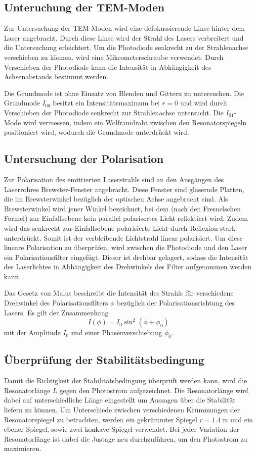 \subsection{Unteruchung der TEM-Moden}
Zur Untersuchung der TEM-Moden wird eine defokussierende Linse hinter dem Laser
angebracht.
Durch diese Linse wird der Strahl des Lasers verbreitert und die Untersuchung
erleichtert.
Um die Photodiode senkrecht zu der Strahlenachse verschieben zu können, wird eine
Mikrometerschraube verwendet. Durch Verschieben der Photodiode kann
die Intensität in Abhängigkeit des Achsenabstands bestimmt werden.

Die Grundmode ist ohne Einsatz von Blenden und Gittern zu untersuchen.
Die Grundmode $I_{00}$ besitzt ein Intensitätsmaximum bei $r = 0$
und wird durch Verschieben der Photodiode senkrecht zur Strahlenachse
untersucht.
Die $I_{01}$-Mode wird vermessen,
indem ein Wolframdraht zwischen den Resonatorspiegeln positioniert wird,
wodurch die Grundmode unterdrückt wird.


\subsection{Untersuchung der Polarisation}
Zur Polarisation des emittierten Laserstrahls sind an den Ausgängen des
Laserrohres Brewster-Fenster angebracht.
Diese Fenster sind gläsernde Platten, die im Brewsterwinkel bezüglich der
optischen Achse angebracht sind.
Als Brewsterwinkel wird jener Winkel bezeichnet,
bei dem (nach den Fresnelschen Formel) zur
Einfallsebene kein parallel polarisertes Licht reflektiert wird.
Zudem wird das senkrecht zur Einfallsebene polarisierte Licht
durch Reflexion stark unterdrückt.
Somit ist der verbleibende Lichtstrahl linear polarisiert.
Um diese lineare Polarisation zu überprüfen, wird zwischen die Photodiode
und den Laser ein Polarisationsfilter eingefügt.
Dieser ist drehbar gelagert, sodass die Intensität des Laserlichtes in
Abhängigkeit des Drehwinkels des Filter aufgenommen werden kann.

Das Gesetz von Malus beschreibt die Intensität des Strahls für verschiedene
Drehwinkel des Polarisationsfilters $\phi$ bezüglich der Polarisationsrichtung
des Lasers.
Es gilt der Zusammenhang
\begin{equation}
  I\left(\phi\right) = I_0 \sin^2 \left(\phi + \phi_0\right)
  \label{eqn:pol}
\end{equation}
mit der Amplitude $I_0$ und einer Phasenverschiebung $\phi_0$.

\subsection{Überprüfung der Stabilitätsbedingung}
Damit die Richtigkeit der Stabilitätsbedingung überprüft werden kann, wird die
Resonatorlänge $L$ gegen den Photostrom aufgezeichnet. Die Resonatorlänge wird
dabei auf unterschiedliche Länge eingestellt um Aussagen über die Stabilität
liefern zu können. Um Unterschiede zwischen verschiedenen Krümmungen der
Resonatorspiegel zu betrachten,
werden ein gekrümmter Spiegel $r=\SI{1.4}{\metre}$ und ein ebener Spiegel, sowie
zwei konkave Spiegel verwendet.
Bei jeder Variation der Resonatorlänge ist dabei die Justage neu durchzuführen,
um den Photostrom zu maximieren.
